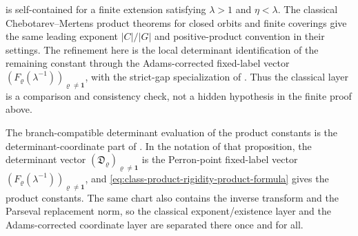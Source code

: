 \begin{remark}
  \label{rem:main-iii-classical-product-layer}
   is self-contained for a finite
  extension satisfying \(\lambda>1\) and \(\eta<\lambda\).  The classical
  Chebotarev--Mertens product theorems for closed orbits and finite coverings
  \cite{MeslizaNoorani1999FrobeniusMertens,Sharp1991Mertens,ParryPollicott1986Chebotarev,NooraniParry1992ChebotarevShifts}
  give the same leading exponent \(|C|/|G|\) and positive-product convention in
  their settings.  The refinement here is the local determinant identification
  of the remaining constant through the Adams-corrected fixed-label vector
  \((F_\varrho(\lambda^{-1}))_{\varrho\ne\mathbf1}\), with the
  strict-gap specialization of
  .  Thus the classical layer is
  a comparison and consistency check, not a hidden hypothesis in the finite
  proof above.
\end{remark}


The branch-compatible determinant evaluation of the product constants is the
determinant-coordinate part of .
In the notation of that proposition, the determinant vector
\((\mathfrak D_\varrho)_{\varrho\ne\mathbf1}\) is the Perron-point fixed-label
vector \((F_\varrho(\lambda^{-1}))_{\varrho\ne\mathbf1}\), and
\eqref{eq:class-product-rigidity-product-formula} gives the product constants.
The same chart also contains the inverse transform and the Parseval replacement
norm, so the classical exponent/existence layer and the Adams-corrected
coordinate layer are separated there once and for all.
